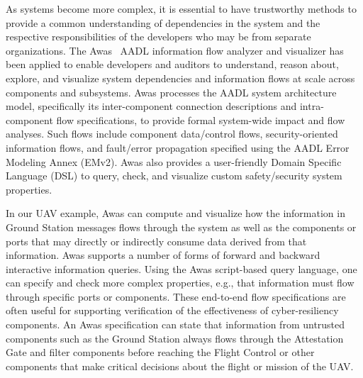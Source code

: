 
As systems become more complex, 
it is essential to have trustworthy methods
to provide a common understanding of dependencies in the system and
the respective responsibilities of the developers who may be from separate organizations.  
%
The Awas~\cite{awas} AADL information flow analyzer and visualizer has been 
applied to enable developers and auditors to understand, reason about,
explore, and visualize system dependencies and information flows at
scale across components and subsystems.  Awas processes the AADL
system architecture model, specifically its inter-component connection
descriptions and intra-component flow specifications, to provide
formal system-wide impact and flow analyses.
Such flows include component data/control flows,
security-oriented information flows, and fault/error propagation
specified using the AADL Error Modeling Annex (EMv2).
Awas also provides a user-friendly Domain Specific Language (DSL) to 
query, check, and visualize custom safety/security system properties.

%
In our UAV example, Awas can compute and visualize how the information in Ground Station messages flows through the system
as well as the components or ports that may directly or indirectly consume data derived from that information.
Awas supports a number of forms of forward and backward interactive information queries.
Using the Awas script-based query language, one can specify and check more complex properties, e.g.,
that information must flow through specific ports or components.
These end-to-end flow specifications are often useful for supporting verification of the
effectiveness of cyber-resiliency components.   An Awas specification can state that
information from untrusted components such as the Ground Station always flows through the
Attestation Gate and filter components before reaching the Flight Control or other components
that make critical decisions about the flight or mission of the UAV.

